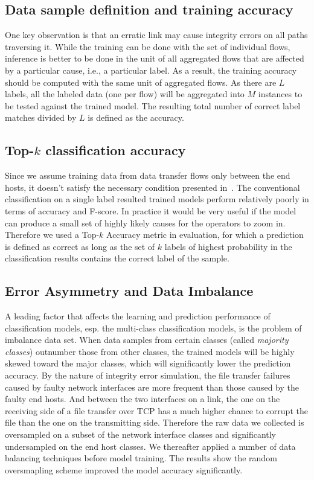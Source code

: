 \subsection{Data sample definition and training accuracy}
One key observation is that an erratic link may cause integrity errors on all paths traversing it. While the training can be done with the set of individual flows, inference is better to be done in the unit of all aggregated flows that are affected by a particular cause, i.e., a particular label. As a result, the training accuracy should be computed with the same unit of aggregated flows. As there are $L$ labels, all the labeled data (one per flow) will be aggregated into $M$ instances to be tested against the trained model. The resulting total number of correct label matches divided by $L$ is defined as the accuracy.

\subsection{Top-$k$ classification accuracy} 
Since we assume training data from data transfer flows only between the end hosts, it doesn't satisfy the necessary condition presented in~\cite{netbouncer:nsdi18}. The conventional classification on a single label resulted trained models perform relatively poorly in terms of accuracy and F-score. In practice it would be very useful if the model can produce a small set of highly likely causes for the operators to zoom in. Therefore we used a Top-$k$ Accuracy metric in evaluation, for which a prediction is defined as correct as long as the set of $k$ labels of highest probability in the classification results contains the correct label of the sample.

\subsection{Error Asymmetry and Data Imbalance} 
\label{sub:ml:imbalance}
A leading factor that affects the learning and prediction performance of classification models, esp. the multi-class classification models, is the problem of imbalance data set. When data samples from certain classes (called {\it majority classes}) outnumber those from other classes, the trained models will be highly skewed toward the major classes, which will significantly lower the prediction accuracy. By the nature of integrity error simulation, the file transfer failures caused by faulty network interfaces are more frequent than those caused by the faulty end hosts. And between the two interfaces on a link, the one on the receiving side of a file transfer over TCP has a much higher chance to corrupt the file than the one on the transmitting side. Therefore the raw data we collected is oversampled on a subset of the network interface classes and significantly undersampled on the end host classes. We thereafter applied a number of data balancing techniques before model training. The results show the random oversmapling scheme improved the model accuracy significantly.